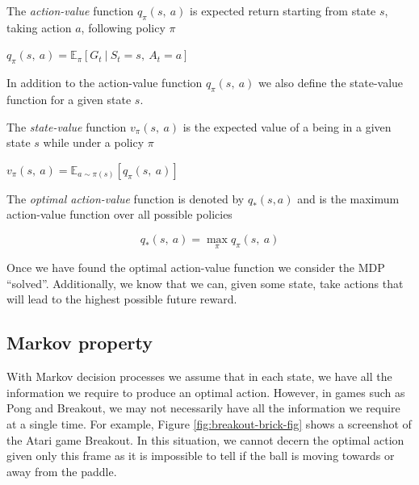 \begin{defn}
	\label{action-value-func}
	The \textit{action-value} function $q_\pi(s,~a)$ is expected return starting from state $s$, taking action $a$, following policy $\pi$
	\begin{center}
		$q_\pi(s,~a)=\mathbb{E}_\pi[G_t~|~S_t=s,~A_t=a]$
	\end{center}
\end{defn}

\noindent In addition to the action-value function $q_\pi(s,~a)$ we also define the state-value function for a given state $s$.

\begin{defn}
	\label{state-value-func}
	The \textit{state-value} function $v_\pi(s,~a)$ is the expected value of a being in a given state $s$ while under a policy $\pi$

	\begin{center}
		$v_\pi(s,~a) = \mathbb{E}_{a\sim \pi(s)}\left[q_\pi(s,~a)\right]$
	\end{center}
\end{defn}

\begin{defn}
	The \textit{optimal action-value} function is denoted by $q_*(s, a)$ and is the maximum action-value function over all possible policies
	\vspace*{-7mm}
	\begin{center}
		$$q_*(s,~a)=\max_\pi q_\pi(s,~a)$$
	\end{center}
\end{defn}

Once we have found the optimal action-value function we consider the MDP ``solved''. Additionally, we know that we can, given some state, take actions that will lead to the highest possible future reward.

\subsection{Markov property}
\label{dsgn:sec:markov-prop}
With Markov decision processes we assume that in each state, we have all the information we require to produce an optimal action. However, in games such as Pong and Breakout, we may not necessarily have all the information we require at a single time. For example, Figure \ref{fig:breakout-brick-fig} shows a screenshot of the Atari game Breakout. In this situation, we cannot decern the optimal action given only this frame as it is impossible to tell if the ball is moving towards or away from the paddle.

